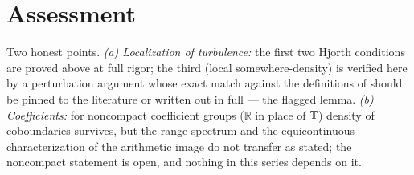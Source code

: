 \section{Assessment}\label{XXXIX:sec:assessment}

Two honest points. \emph{(a) Localization of turbulence:} the first two Hjorth
conditions are proved above at full rigor; the third (local somewhere-density) is
verified here by a perturbation argument whose exact match against the definitions of
\cite{Hjorth} should be pinned to the literature or written out in full --- the flagged
lemma. \emph{(b) Coefficients:} for noncompact coefficient groups ($\mathbb R$ in place
of $\mathbb{T}$) density of coboundaries survives, but the range spectrum and the
equicontinuous characterization of the arithmetic image do not transfer as stated; the
noncompact statement is open, and nothing in this series depends on it.

